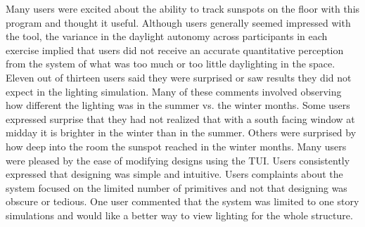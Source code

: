 \documentclass[review]{vgtc}                 %
\begin{document}
Many users were excited about the ability to track sunspots on the
floor with this program and thought it useful.  Although users
generally seemed impressed with the tool, the variance in the daylight
autonomy across participants in each exercise implied that users did not
receive an accurate quantitative perception from the system of what
was too much or too little daylighting in the space.
%
Eleven out of thirteen users said they were 
surprised or saw results they did not expect in the lighting
simulation.   Many of these comments
involved observing how different the lighting was in the summer
vs. the winter months.  Some users expressed surprise that they had
not realized that with a south facing window at midday it is brighter
in the winter than in the summer.  Others
were surprised by how deep into the room the sunspot reached in the
winter months.
%
Many users were pleased by the ease of modifying designs using the
TUI.  Users consistently expressed that designing was simple and
intuitive.  Users complaints about the system focused on the limited
number of primitives and not that designing was obscure or tedious.
One user commented that the system was limited to one story
simulations and would like a better way to view lighting for the whole
structure.

%
%
\end{document}
